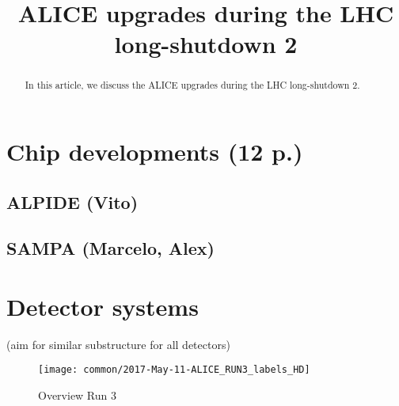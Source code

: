 \documentclass[ALICE,manyauthors]{cernphprep}
\begin{document}
\begin{titlepage}

\title{ALICE upgrades during the LHC long-shutdown 2}


\begin{abstract}
In this article, we discuss the ALICE upgrades during the LHC long-shutdown 2.
\end{abstract}
\end{titlepage}

\setcounter{page}{2} %

\tableofcontents
\listoffigures

\nocite{EBGuidelineEditing}





\section{Chip developments (12 p.)}
\subsection{ALPIDE (Vito)}
\subsection{SAMPA (Marcelo, Alex)}

\section{Detector systems}
(aim for similar substructure for all detectors)

\begin{figure}
\centering
\texttt{[image: common/2017-May-11-ALICE\_RUN3\_labels\_HD]}
\caption{Overview Run 3}
\label{fig:alice_run3}
\end{figure}
\end{document}
